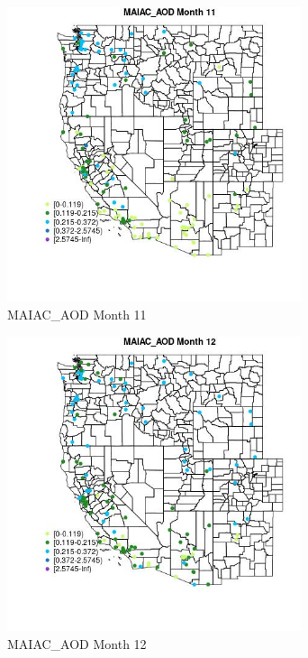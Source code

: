 \begin{figure} 
\centering  
\includegraphics[width=0.77\textwidth]{Code_Outputs/Report_ML_input_PM25_Step4_part_e_de_duplicated_aves_MapObsMo11MAIAC_AOD.jpg} 
\caption{\label{fig:Report_ML_input_PM25_Step4_part_e_de_duplicated_avesMapObsMo11MAIAC_AOD}MAIAC_AOD Month 11} 
\end{figure} 
 

\begin{figure} 
\centering  
\includegraphics[width=0.77\textwidth]{Code_Outputs/Report_ML_input_PM25_Step4_part_e_de_duplicated_aves_MapObsMo12MAIAC_AOD.jpg} 
\caption{\label{fig:Report_ML_input_PM25_Step4_part_e_de_duplicated_avesMapObsMo12MAIAC_AOD}MAIAC_AOD Month 12} 
\end{figure} 
 

